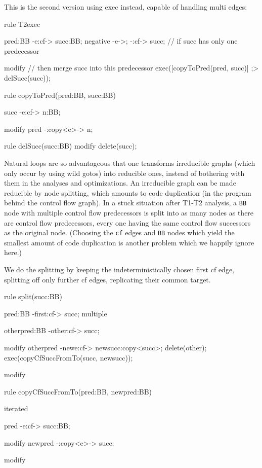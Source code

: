 This is the second version using exec instead, capable of handling multi edges:

  \begin{example}
    \begin{grgen}
rule T2exec
{
  pred:BB -e:cf-> succ:BB;
  negative {
    -e->;
    -:cf-> succ; // if succ has only one predecessor
  }

  modify { // then merge succ into this predecessor
    exec([copyToPred(pred, succ)] ;> delSucc(succ));
  }
}

rule copyToPred(pred:BB, succ:BB)
{
  succ -e:cf-> n:BB;

  modify {
    pred -:copy<e>-> n;
  }
}

rule delSucc(succ:BB)
{
  modify {
    delete(succ);
  }
}
    \end{grgen}
  \end{example}

Natural loops are so advantageous that one transforms irreducible graphs (which only occur by using wild gotos) into reducible ones, instead of bothering with them in the analyses and optimizations.
An irreducible graph can be made reducible by node splitting, which amounts to code duplication (in the program behind the control flow graph).
In a stuck situation after T1-T2 analysis, a \texttt{BB} node with multiple control flow predecessors is split into as many nodes as there are control flow predecessors, every one having the same control flow successors as the original node.
(Choosing the \texttt{cf} edges and \texttt{BB} nodes which yield the smallest amount of code duplication is another problem which we happily ignore here.)

  \begin{example}
We do the splitting by keeping the indeterministically chosen first cf edge, splitting off only further cf edges, replicating their common target.

    \begin{grgen}
rule split(succ:BB)
{
  pred:BB -first:cf-> succ;
  multiple {
    otherpred:BB -other:cf-> succ;

    modify {
      otherpred -newe:cf-> newsucc:copy<succ>;
      delete(other);
      exec(copyCfSuccFromTo(succ, newsucc));
    }
  }

  modify {
  }
}

rule copyCfSuccFromTo(pred:BB, newpred:BB)
{
  iterated {
    pred -e:cf-> succ:BB;

    modify {
      newpred -:copy<e>-> succ;
    }
  }

  modify {
  }
}
    \end{grgen}
  \end{example}

